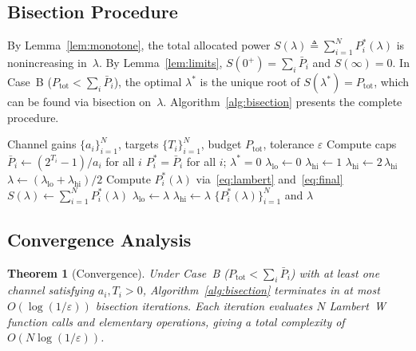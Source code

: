 \documentclass[journal]{IEEEtran}
\newtheorem{theorem}{Theorem}
\begin{document}
\subsection{Bisection Procedure}

By Lemma~\ref{lem:monotone}, the total allocated power $S(\lambda) \triangleq \sum_{i=1}^{N} P_i^*(\lambda)$ is nonincreasing in~$\lambda$.
By Lemma~\ref{lem:limits}, $S(0^+) = \sum_i \bar{P}_i$ and $S(\infty) = 0$.
In Case~B ($P_{\mathrm{tot}} < \sum_i \bar{P}_i$), the optimal $\lambda^*$ is the unique root of $S(\lambda^*) = P_{\mathrm{tot}}$, which can be found via bisection on~$\lambda$.
Algorithm~\ref{alg:bisection} presents the complete procedure.

\begin{algorithm}[t]
\caption{Target-rate least-squares power allocation via bisection}
\label{alg:bisection}
\begin{algorithmic}[1]
\REQUIRE Channel gains $\{a_i\}_{i=1}^N$, targets $\{T_i\}_{i=1}^N$, budget $P_{\mathrm{tot}}$, tolerance $\varepsilon$
\STATE Compute caps $\bar{P}_i \leftarrow (2^{T_i}-1)/a_i$ for all $i$
    \RETURN $P_i^* = \bar{P}_i$ for all $i$; \quad $\lambda^* = 0$
\ENDIF
\STATE $\lambda_{\mathrm{lo}} \leftarrow 0$
\STATE $\lambda_{\mathrm{hi}} \leftarrow 1$
    \STATE $\lambda_{\mathrm{hi}} \leftarrow 2\,\lambda_{\mathrm{hi}}$
\ENDWHILE
\REPEAT
    \STATE $\lambda \leftarrow (\lambda_{\mathrm{lo}} + \lambda_{\mathrm{hi}})/2$
        \STATE Compute $P_i^*(\lambda)$ via~\eqref{eq:lambert} and~\eqref{eq:final}
    \ENDFOR
    \STATE $S(\lambda) \leftarrow \sum_{i=1}^{N} P_i^*(\lambda)$
        \STATE $\lambda_{\mathrm{lo}} \leftarrow \lambda$
    \ELSE
        \STATE $\lambda_{\mathrm{hi}} \leftarrow \lambda$
    \ENDIF
{}
\RETURN $\{P_i^*(\lambda)\}_{i=1}^N$ and $\lambda$
\end{algorithmic}
\end{algorithm}

\subsection{Convergence Analysis}

\begin{theorem}[Convergence]
\label{thm:convergence}
Under Case~B ($P_{\mathrm{tot}} < \sum_i \bar{P}_i$) with at least one channel satisfying $a_i, T_i > 0$, Algorithm~\ref{alg:bisection} terminates in at most $O(\log(1/\varepsilon))$ bisection iterations.
Each iteration evaluates $N$ Lambert~W function calls and elementary operations, giving a total complexity of $O(N \log(1/\varepsilon))$.
\end{theorem}
\end{document}
